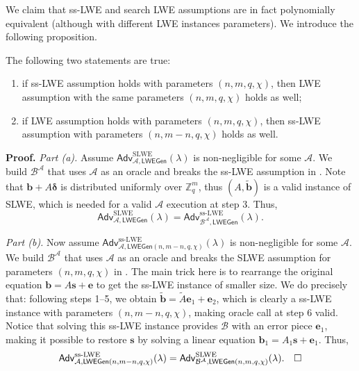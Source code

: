 \documentclass{template}
\newcommand{\qedwhite}{\hfill \ensuremath{\Box}}
\begin{document}
We claim that ss-LWE and search LWE assumptions are in fact polynomially
equivalent (although with different LWE instances parameters). We introduce the
following proposition.

\begin{proposition}
    The following two statements are true:
    \begin{enumerate}
        \item[(a)] if \textsf{ss}-\textsf{LWE} assumption holds with parameters
        $(n,m,q,\chi)$, then \textsf{LWE} assumption with the same parameters
        $(n,m,q,\chi)$ holds as well;
        \item[(b)] if \textsf{LWE} assumption holds with parameters
        $(n,m,q,\chi)$, then \textsf{ss}-\textsf{LWE} assumption with parameters
        $(n,m-n,q,\chi)$ holds as well.
    \end{enumerate}
\end{proposition}

\textbf{Proof.} \textit{Part (a).} Assume
$\mathsf{Adv}^{\text{SLWE}}_{\mathcal{A},\mathsf{LWEGen}}(\lambda)$ is
non-negligible for some $\mathcal{A}$. We build $\mathcal{B}^{\mathcal{A}}$ that
uses $\mathcal{A}$ as an oracle and breaks the \textsf{ss}-\textsf{LWE}
assumption in . Note that $\mathbf{b} +
A\boldsymbol{\delta}$ is distributed uniformly over $\mathbb{Z}_q^m$, thus
$(A,\widetilde{\mathbf{b}})$ is a valid instance of \textsf{SLWE}, which is
needed for a valid $\mathcal{A}$ execution at step 3. Thus,
\begin{equation*}
    \mathsf{Adv}^{\text{SLWE}}_{\mathcal{A},\mathsf{LWEGen}}(\lambda) = \mathsf{Adv}^{\text{ss-LWE}}_{\mathcal{B}^{\mathcal{A}},\mathsf{LWEGen}}(\lambda).
\end{equation*}

\textit{Part (b).} Now assume
$\mathsf{Adv}^{\text{ss-LWE}}_{\mathcal{A},\mathsf{LWEGen}(n,m-n,q,\chi)}(\lambda)$
is non-negligible for some $\mathcal{A}$. We build $\mathcal{B}^{\mathcal{A}}$
that uses $\mathcal{A}$ as an oracle and breaks the \textsf{SLWE} assumption for
parameters $(n,m,q,\chi)$ in . The main trick here is
to rearrange the original equation $\mathbf{b}=A\mathbf{s}+\mathbf{e}$ to get
the \textsf{ss-LWE} instance of smaller size. We do precisely that: following
steps 1--5, we obtain $\widetilde{\mathbf{b}} = \widetilde{A}\mathbf{e}_1 +
\mathbf{e}_2$, which is clearly a \textsf{ss-LWE} instance with parameters
$(n,m-n,q,\chi)$, making oracle call at step 6 valid. Notice that solving this
\textsf{ss-LWE} instance provides $\mathcal{B}$ with an error piece
$\mathbf{e}_1$, making it possible to restore $\mathbf{s}$ by solving a linear
equation $\mathbf{b}_1 = A_1\mathbf{s} + \mathbf{e}_1$. Thus,
\begin{equation*}
    \mathsf{Adv}^{\text{ss-LWE}}_{\mathcal{A},\mathsf{LWEGen}(n,m-n,q,\chi)}(\lambda) = \mathsf{Adv}^{\text{SLWE}}_{\mathcal{B}^{\mathcal{A}},\mathsf{LWEGen}(n,m,q,\chi)}(\lambda). \quad \qedwhite
\end{equation*}
\end{document}
